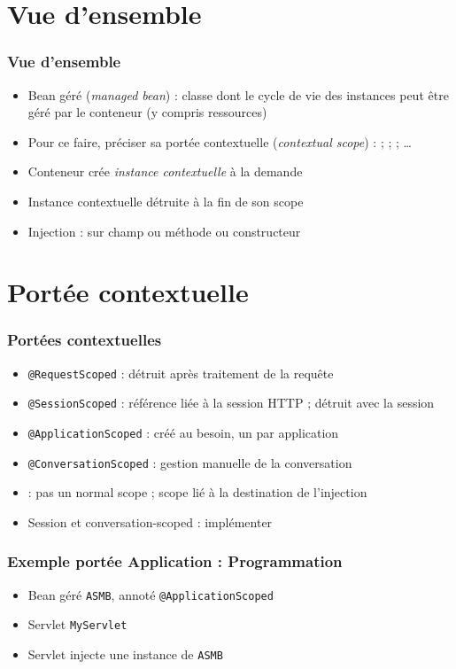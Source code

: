 \documentclass[english, french]{beamer}
\begin{document}
\section{Vue d’ensemble}
\begin{frame}
	\frametitle{Vue d’ensemble}
	\begin{itemize}
		\item Bean géré (\emph{managed bean}) : classe dont le cycle de vie des instances peut être géré par le conteneur (y compris ressources)
		\item Pour ce faire, préciser sa portée contextuelle (\emph{contextual scope}) :  ;  ;  ; …
		\item Conteneur crée \emph{instance contextuelle} à la demande
		\item Instance contextuelle détruite à la fin de son scope
		\item Injection :  sur champ {\tiny ou méthode ou constructeur}
	\end{itemize}
\end{frame}

\section{Portée contextuelle}
\begin{frame}
	\frametitle{Portées contextuelles}
	\begin{itemize}
		\item \texttt{@RequestScoped} : détruit après traitement de la requête
		\item \texttt{@SessionScoped} : référence liée à la session HTTP ; détruit avec la session
		\item \texttt{@ApplicationScoped} : créé au besoin, un par application
		\item \texttt{@ConversationScoped} : gestion manuelle de la conversation
		\item {} : pas un normal scope ; scope lié à la destination de l’injection
		\item Session et conversation-scoped : implémenter 
	\end{itemize}
\end{frame}

\begin{frame}
	\frametitle{Exemple portée Application : Programmation}
	\begin{itemize}
		\item Bean géré \texttt{ASMB}, annoté \texttt{@ApplicationScoped}
		\item Servlet \texttt{MyServlet}
		\item Servlet injecte une instance de \texttt{ASMB}
	\end{itemize}
\end{frame}
\end{document}
